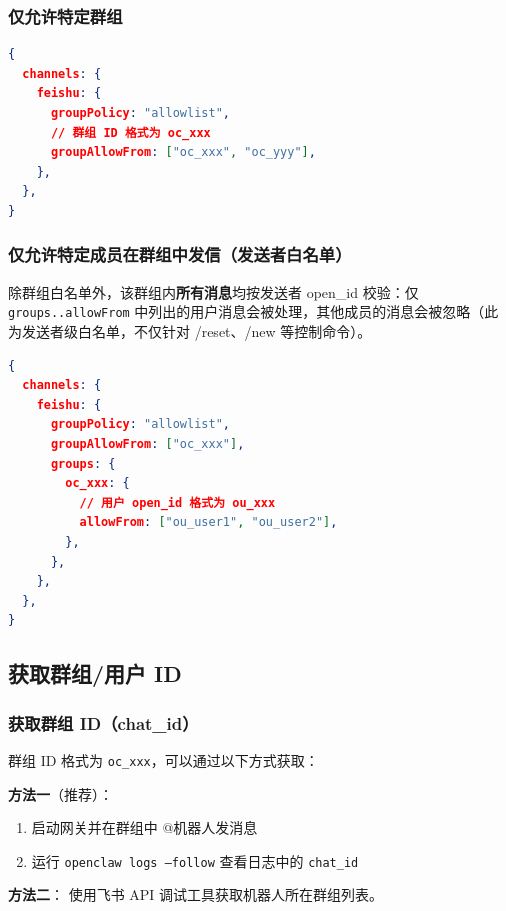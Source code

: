 \subsubsection{仅允许特定群组}


\begin{lstlisting}[language=json]
{
  channels: {
    feishu: {
      groupPolicy: "allowlist",
      // 群组 ID 格式为 oc_xxx
      groupAllowFrom: ["oc_xxx", "oc_yyy"],
    },
  },
}
\end{lstlisting}


\subsubsection{仅允许特定成员在群组中发信（发送者白名单）}


除群组白名单外，该群组内\textbf{所有消息}均按发送者 open\_id 校验：仅 \texttt{groups..allowFrom} 中列出的用户消息会被处理，其他成员的消息会被忽略（此为发送者级白名单，不仅针对 /reset、/new 等控制命令）。

\begin{lstlisting}[language=json]
{
  channels: {
    feishu: {
      groupPolicy: "allowlist",
      groupAllowFrom: ["oc_xxx"],
      groups: {
        oc_xxx: {
          // 用户 open_id 格式为 ou_xxx
          allowFrom: ["ou_user1", "ou_user2"],
        },
      },
    },
  },
}
\end{lstlisting}


\hrulefill


\subsection{获取群组/用户 ID}


\subsubsection{获取群组 ID（chat\_id）}


群组 ID 格式为 \texttt{oc\_xxx}，可以通过以下方式获取：

\textbf{方法一}（推荐）：

\begin{enumerate}
  \item 启动网关并在群组中 @机器人发消息
  \item 运行 \texttt{openclaw logs --follow} 查看日志中的 \texttt{chat\_id}
\end{enumerate}


\textbf{方法二}：
使用飞书 API 调试工具获取机器人所在群组列表。

